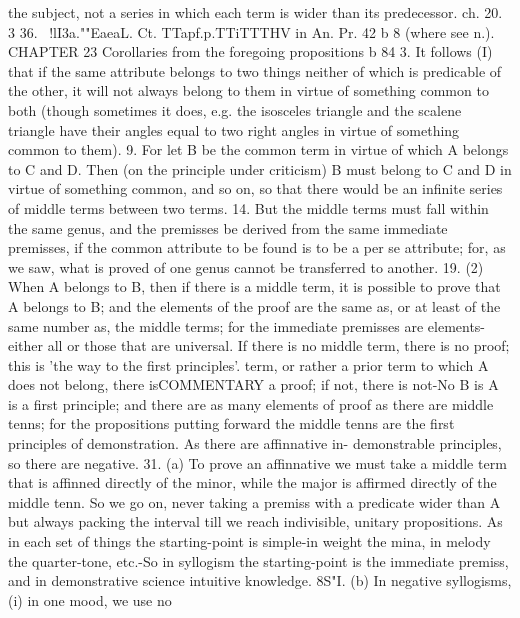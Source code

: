 {{{{{{{{{{{{{{{{{{{{{{{{{{{{{{the subject, not a series in which each term is wider than its
predecessor.
ch. 20.
3%
36. ~!lI3a.""EaeaL. Ct. TTapf.p.TTiTTTHV in An. Pr. 42 b 8 (where
see n.).
CHAPTER 23
Corollaries from the foregoing propositions
b
84 3. It follows (I) that if the same attribute belongs to two
things neither of which is predicable of the other, it will not
always belong to them in virtue of something common to both
(though sometimes it does, e.g. the isosceles triangle and the
scalene triangle have their angles equal to two right angles in
virtue of something common to them).
9. For let B be the common term in virtue of which A belongs
to C and D. Then (on the principle under criticism) B must
belong to C and D in virtue of something common, and so on,
so that there would be an infinite series of middle terms between
two terms.
14. But the middle terms must fall within the same genus,
and the premisses be derived from the same immediate premisses,
if the common attribute to be found is to be a per se attribute;
for, as we saw, what is proved of one genus cannot be transferred
to another.
19. (2) When A belongs to B, then if there is a middle term, it
is possible to prove that A belongs to B; and the elements of the
proof are the same as, or at least of the same number as, the
middle terms; for the immediate premisses are elements-either
all or those that are universal. If there is no middle term, there
is no proof; this is 'the way to the first principles'.
term, or rather a prior term to which A does not belong, there isCOMMENTARY
a proof; if not, there is not-No B is A is a first principle; and
there are as many elements of proof as there are middle tenns;
for the propositions putting forward the middle tenns are the
first principles of demonstration. As there are affinnative in-
demonstrable principles, so there are negative.
31. (a) To prove an affinnative we must take a middle term
that is affinned directly of the minor, while the major is affirmed
directly of the middle tenn. So we go on, never taking a premiss
with a predicate wider than A but always packing the interval
till we reach indivisible, unitary propositions. As in each set of
things the starting-point is simple-in weight the mina, in melody
the quarter-tone, etc.-So in syllogism the starting-point is the
immediate premiss, and in demonstrative science intuitive
knowledge.
8S"I. (b) In negative syllogisms, (i) in one mood, we use no
}}}}}}}}}}}}}}}}}}}}}}}}}}}}}}
